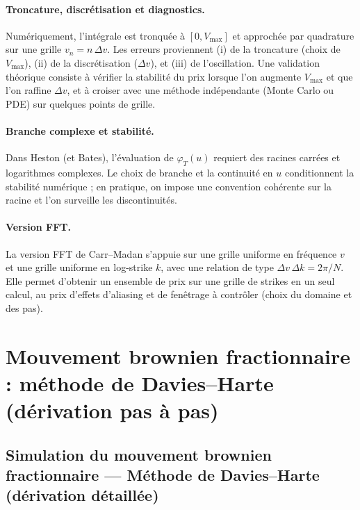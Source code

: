 \documentclass[11pt,a4paper]{article}
\newcommand{\1}{\mathbf{1}}
\begin{document}
\paragraph{Troncature, discr\'etisation et diagnostics.}
Num\'eriquement, l'int\'egrale est tronqu\'ee \`a $[0,V_{\max}]$ et approch\'ee par quadrature sur une grille $v_n=n\,\Delta v$.
Les erreurs proviennent (i) de la troncature (choix de $V_{\max}$), (ii) de la discr\'etisation ($\Delta v$), et (iii) de l'oscillation.
Une validation th\'eorique consiste \`a v\'erifier la stabilit\'e du prix lorsque l'on augmente $V_{\max}$ et que l'on raffine $\Delta v$,
et \`a croiser avec une m\'ethode ind\'ependante (Monte Carlo ou PDE) sur quelques points de grille.

\paragraph{Branche complexe et stabilit\'e.}
Dans Heston (et Bates), l'\'evaluation de $\varphi_T(u)$ requiert des racines carr\'ees et logarithmes complexes. Le choix de branche
et la continuit\'e en $u$ conditionnent la stabilit\'e num\'erique ; en pratique, on impose une convention coh\'erente sur la racine
et l'on surveille les discontinuit\'es.

\paragraph{Version FFT.}
La version FFT de Carr--Madan s'appuie sur une grille uniforme en fr\'equence $v$ et une grille uniforme en log-strike $k$,
avec une relation de type $\Delta v\,\Delta k = 2\pi/N$. Elle permet d'obtenir un ensemble de prix sur une grille de strikes en un seul
calcul, au prix d'effets d'aliasing et de fen\^etrage \`a contr\^oler (choix du domaine et des pas).

\section{Mouvement brownien fractionnaire : m\'ethode de Davies--Harte (d\'erivation pas \`a pas)}
\label{sec:deriv-fbm}

\subsection*{Simulation du mouvement brownien fractionnaire --- Méthode de Davies--Harte (dérivation détaillée)}

\end{document}
